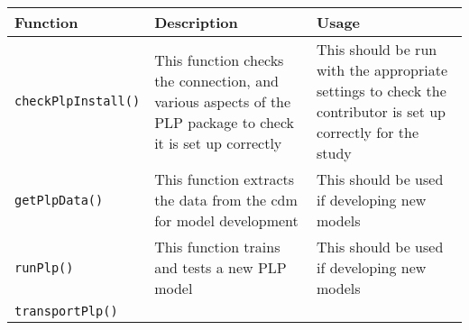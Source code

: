 \documentclass[
]{article}
\begin{document}
\begin{longtable}[]{@{}lll@{}}
\toprule
\begin{minipage}[b]{0.26\columnwidth}\raggedright
Function\strut
\end{minipage} & \begin{minipage}[b]{0.42\columnwidth}\raggedright
Description\strut
\end{minipage} & \begin{minipage}[b]{0.23\columnwidth}\raggedright
Usage\strut
\end{minipage}\tabularnewline
\midrule
\endhead
\begin{minipage}[t]{0.26\columnwidth}\raggedright
\texttt{checkPlpInstall()}\strut
\end{minipage} & \begin{minipage}[t]{0.42\columnwidth}\raggedright
This function checks the connection, and various aspects of the PLP
package to check it is set up correctly\strut
\end{minipage} & \begin{minipage}[t]{0.23\columnwidth}\raggedright
This should be run with the appropriate settings to check the
contributor is set up correctly for the study\strut
\end{minipage}\tabularnewline
\begin{minipage}[t]{0.26\columnwidth}\raggedright
\texttt{getPlpData()}\strut
\end{minipage} & \begin{minipage}[t]{0.42\columnwidth}\raggedright
This function extracts the data from the cdm for model development\strut
\end{minipage} & \begin{minipage}[t]{0.23\columnwidth}\raggedright
This should be used if developing new models\strut
\end{minipage}\tabularnewline
\begin{minipage}[t]{0.26\columnwidth}\raggedright
\texttt{runPlp()}\strut
\end{minipage} & \begin{minipage}[t]{0.42\columnwidth}\raggedright
This function trains and tests a new PLP model\strut
\end{minipage} & \begin{minipage}[t]{0.23\columnwidth}\raggedright
This should be used if developing new models\strut
\end{minipage}\tabularnewline
\begin{minipage}[t]{0.26\columnwidth}\raggedright
\texttt{transportPlp()}\strut

\end{minipage}
\end{longtable}
\end{document}
